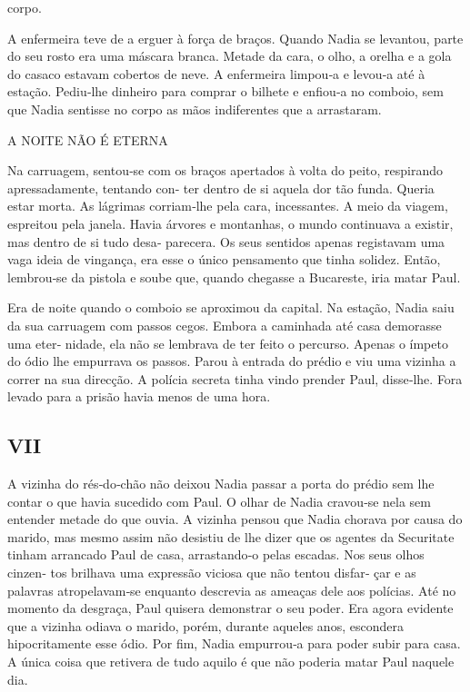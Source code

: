 corpo.

A enfermeira teve de a erguer à força de braços. Quando Nadia se
levantou, parte do seu rosto era uma máscara branca. Metade da cara, o
olho, a orelha e a gola do casaco estavam cobertos de neve. A enfermeira
limpou‑a e levou‑a até à estação. Pediu‑lhe dinheiro para comprar o
bilhete e enfiou‑a no comboio, sem que Nadia sentisse no corpo as mãos
indiferentes que a arrastaram.

A NOITE NÃO É ETERNA

Na carruagem, sentou‑se com os braços apertados à volta do peito,
respirando apressadamente, tentando con‑ ter dentro de si aquela dor tão
funda. Queria estar morta. As lágrimas corriam‑lhe pela cara,
incessantes. A meio da viagem, espreitou pela janela. Havia árvores e
montanhas, o mundo continuava a existir, mas dentro de si tudo desa‑
parecera. Os seus sentidos apenas registavam uma vaga ideia de vingança,
era esse o único pensamento que tinha solidez. Então, lembrou‑se da
pistola e soube que, quando chegasse a Bucareste, iria matar Paul.

Era de noite quando o comboio se aproximou da capital. Na estação, Nadia
saiu da sua carruagem com passos cegos. Embora a caminhada até casa
demorasse uma eter‑ nidade, ela não se lembrava de ter feito o percurso.
Apenas o ímpeto do ódio lhe empurrava os passos. Parou à entrada do
prédio e viu uma vizinha a correr na sua direcção. A polícia secreta
tinha vindo prender Paul, disse‑lhe. Fora levado para a prisão havia
menos de uma hora.

\subsection{VII}

A vizinha do rés‑do‑chão não deixou Nadia passar a porta do prédio sem
lhe contar o que havia sucedido com Paul. O olhar de Nadia cravou‑se
nela sem entender metade do que ouvia. A vizinha pensou que Nadia
chorava por causa do marido, mas mesmo assim não desistiu de lhe dizer
que os agentes da Securitate tinham arrancado Paul de casa, arrastando‑o
pelas escadas. Nos seus olhos cinzen‑ tos brilhava uma expressão viciosa
que não tentou disfar‑ çar e as palavras atropelavam‑se enquanto
descrevia as ameaças dele aos polícias. Até no momento da desgraça, Paul
quisera demonstrar o seu poder. Era agora evidente que a vizinha odiava
o marido, porém, durante aqueles anos, escondera hipocritamente esse
ódio. Por fim, Nadia empurrou‑a para poder subir para casa. A única
coisa que retivera de tudo aquilo é que não poderia matar Paul naquele
dia.

